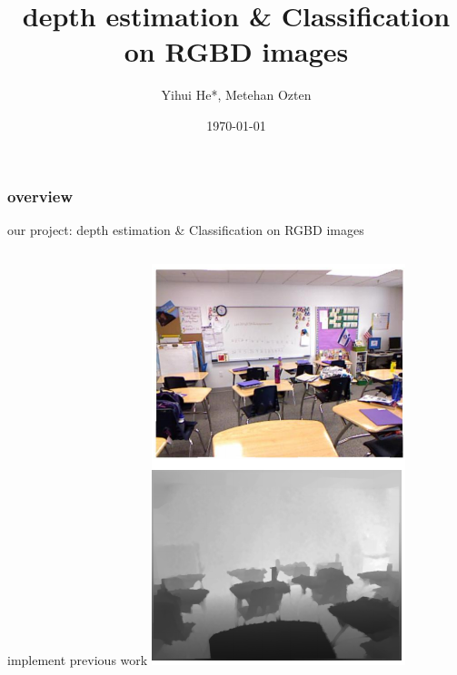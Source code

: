 \documentclass{beamer}
\title[infer depth and transfer learning]{depth estimation \& Classification on RGBD images} %
\author{Yihui He*, Metehan Ozten}
\institute[ ] %
{
\textit{yihuihe@foxmail.com, m\_ozten@umail.ucsb.edu}\\
\medskip
 *CS 2nd year exchange student\\ 
from Xi'an Jiaotong University, China\\%


}\date{\today}
\begin{document}
\begin{frame}
\titlepage
\end{frame}


\begin{frame}
\frametitle{overview}
\begin{alertblock}{our project: depth estimation \& Classification on RGBD images}
\begin{columns}
\begin{column}{.37\textwidth}
\begin{block}{implement previous work}
\includegraphics[width=\linewidth]{im2d.png}

\end{block}
\end{column}
\end{columns}
\end{alertblock}
\end{frame}
\end{document}
